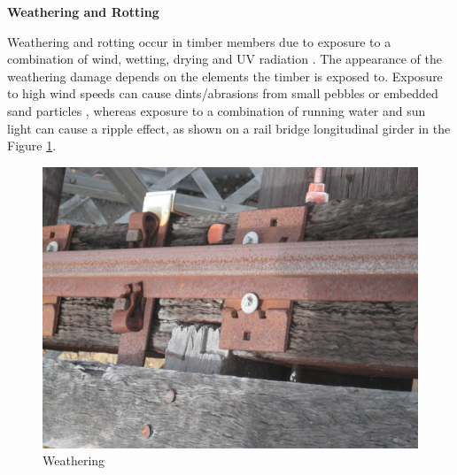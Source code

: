 \documentclass[11pt,a4paper]{article}
\numberwithin{equation}{subsection}
\begin{document}
    \vspace*{\baselineskip}
    
    \noindent
    \textbf{Weathering and Rotting}

	\noindent
	Weathering and rotting occur in timber members due to exposure to a combination of wind, wetting, drying and UV radiation \cite{_timber_2005,_section_2008}. The appearance of the weathering damage depends on the elements the timber is exposed to. Exposure to high wind speeds can cause dints/abrasions from small pebbles or embedded sand particles \cite{harrowfield_analysis_2006}, whereas exposure to a combination of running water and sun light can cause a ripple effect, as shown on a rail bridge longitudinal girder in the Figure \ref{fig:Weather}.
	
\begin{figure}[h]
	\begin{center}
		\includegraphics[scale=0.07]{Weathering}
	\end{center}
	\caption{Weathering}
	\label{fig:Weather}
\end{figure}
	\pagebreak
	
\end{document}
